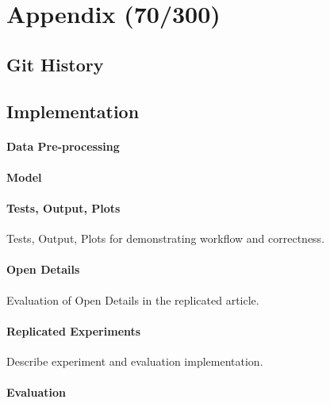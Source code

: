 \appendix
\section{Appendix (70/300)}

\subsection{Git History}

\subsection{Implementation}

\paragraph{Data Pre-processing}

\paragraph{Model}

\paragraph{Tests, Output, Plots}
Tests, Output, Plots for demonstrating workflow and correctness.

\paragraph{Open Details}
Evaluation of Open Details in the replicated article.

\paragraph{Replicated Experiments}
Describe experiment and evaluation implementation.

\paragraph{Evaluation}
